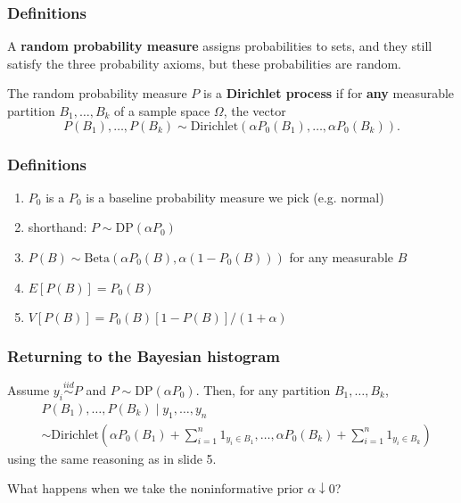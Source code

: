 \documentclass{beamer}
\begin{document}
\begin{frame}
\frametitle{Definitions}

A {\bf random probability measure} assigns probabilities to sets, and they still satisfy the three probability axioms, but these probabilities are random. 
\newline
\pause

The random probability measure $P$ is a {\bf Dirichlet process} if for {\bf any} measurable partition $B_1, \ldots, B_k$ of a sample space $\Omega$, the vector
$$
P(B_1), \ldots, P(B_k) \sim \text{Dirichlet}(\alpha P_0(B_1), \ldots, \alpha P_0(B_k)).
$$


\end{frame}
\begin{frame}
\frametitle{Definitions}


\begin{enumerate}
\item $P_0$ is a $P_0$ is a baseline probability measure we pick (e.g. normal)
\item shorthand: $P \sim \text{DP}(\alpha P_0)$
\item $P(B) \sim \text{Beta}(\alpha P_0(B), \alpha(1-P_0(B)))$ for any measurable $B$
\item $E[P(B)] = P_0(B)$
\item $V[P(B)] = P_0(B)[1-P(B)]/(1+\alpha)$
\end{enumerate}

\end{frame}

\begin{frame}
\frametitle{Returning to the Bayesian histogram}

Assume $y_i \overset{iid}{\sim} P$ and $P \sim \text{DP}(\alpha P_0)$. Then, for any partition $B_1, \ldots, B_k$,  
\begin{align*}
&P(B_1), \ldots, P(B_k) \mid y_1, \ldots, y_n \\
&\sim \text{Dirichlet}\left(\alpha P_0(B_1) + \sum_{i=1}^n 1_{y_i \in B_1}, \ldots, \alpha P_0(B_k) + \sum_{i=1}^n 1_{y_i \in B_k} \right)
\end{align*}
using the same reasoning as in slide 5.
\newline
\pause

What happens when we take the noninformative prior $\alpha \downarrow 0$?

\end{frame}
\end{document}
